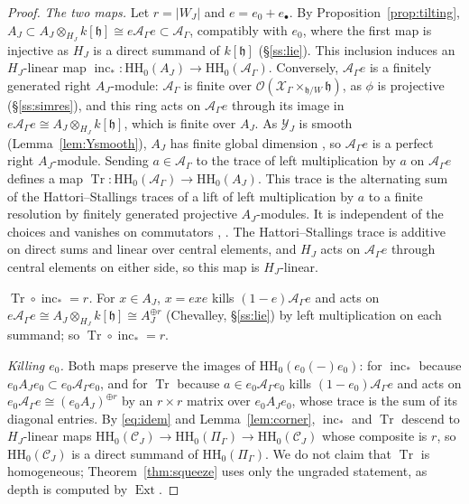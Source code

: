 \documentclass[11pt]{amsart}
\numberwithin{table}{section}
\numberwithin{figure}{section}
\numberwithin{equation}{section}
\theoremstyle{definition}
\theoremstyle{plain}
\newcommand{\cC}{\mathcal{C}}
\newcommand{\cA}{\mathcal{A}}
\newcommand{\cO}{\mathcal{O}}
\newcommand{\cX}{\mathcal{X}}
\newcommand{\cY}{\mathcal{Y}}
\newcommand{\h}{\mathfrak{h}}
\newcommand{\bul}{\bullet}
\newcommand{\HH}{\mathrm{HH}}
\DeclareMathOperator{\Ext}{Ext}
\begin{document}
\begin{proof}
\emph{The two maps.} Let $r = |W_J|$ and $e = e_0 + e_\bul$. By Proposition~\ref{prop:tilting}, $A_J \subset A_J \otimes_{H_J} k[\h] \cong e\cA_\Gamma e \subset \cA_\Gamma$, compatibly with $e_0$, where the first map is injective as $H_J$ is a direct summand of $k[\h]$ (\S\ref{ss:lie}). This inclusion induces an $H_J$-linear map $\operatorname{inc}_*\colon \HH_0(A_J) \to \HH_0(\cA_\Gamma)$. Conversely, $\cA_\Gamma e$ is a finitely generated right $A_J$-module: $\cA_\Gamma$ is finite over $\cO(\cX_\Gamma \times_{\h/W} \h)$, as $\phi$ is projective (\S\ref{ss:simres}), and this ring acts on $\cA_\Gamma e$ through its image in $e\cA_\Gamma e \cong A_J \otimes_{H_J} k[\h]$, which is finite over $A_J$. As $\cY_J$ is smooth (Lemma~\ref{lem:Ysmooth}), $A_J$ has finite global dimension \cite[Cor~3.2.8 and the proof of Cor~3.2.11]{VdB}, so $\cA_\Gamma e$ is a perfect right $A_J$-module. Sending $a \in \cA_\Gamma$ to the trace of left multiplication by $a$ on $\cA_\Gamma e$ defines a map $\operatorname{Tr}\colon \HH_0(\cA_\Gamma) \to \HH_0(A_J)$. This trace is the alternating sum of the Hattori--Stallings traces of a lift of left multiplication by $a$ to a finite resolution by finitely generated projective $A_J$-modules. It is independent of the choices and vanishes on commutators \cite[\S1, Thm~2.2]{Sta}, \cite[Thm~1]{Han}. The Hattori--Stallings trace is additive on direct sums and linear over central elements, and $H_J$ acts on $\cA_\Gamma e$ through central elements on either side, so this map is $H_J$-linear.

\emph{$\operatorname{Tr} \circ \operatorname{inc}_* = r$.} For $x \in A_J$, $x = exe$ kills $(1 - e)\cA_\Gamma e$ and acts on $e\cA_\Gamma e \cong A_J \otimes_{H_J} k[\h] \cong A_J^{\oplus r}$ (Chevalley, \S\ref{ss:lie}) by left multiplication on each summand; so $\operatorname{Tr} \circ \operatorname{inc}_* = r$.

\emph{Killing $e_0$.} Both maps preserve the images of $\HH_0(e_0(-)e_0)$: for $\operatorname{inc}_*$ because $e_0A_Je_0 \subset e_0\cA_\Gamma e_0$, and for $\operatorname{Tr}$ because $a \in e_0\cA_\Gamma e_0$ kills $(1 - e_0)\cA_\Gamma e$ and acts on $e_0\cA_\Gamma e \cong (e_0A_J)^{\oplus r}$ by an $r \times r$ matrix over $e_0A_Je_0$, whose trace is the sum of its diagonal entries. By \eqref{eq:idem} and Lemma~\ref{lem:corner}, $\operatorname{inc}_*$ and $\operatorname{Tr}$ descend to $H_J$-linear maps $\HH_0(\cC_J) \to \HH_0(\Pi_\Gamma) \to \HH_0(\cC_J)$ whose composite is $r$, so $\HH_0(\cC_J)$ is a direct summand of $\HH_0(\Pi_\Gamma)$. We do not claim that $\operatorname{Tr}$ is homogeneous; Theorem~\ref{thm:squeeze} uses only the ungraded statement, as depth is computed by $\Ext$.
\end{proof}
\end{document}
